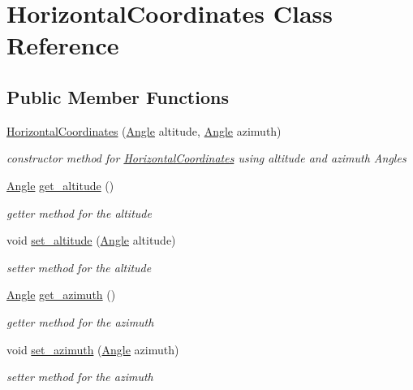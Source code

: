 \hypertarget{classHorizontalCoordinates}{}\section{Horizontal\+Coordinates Class Reference}
\label{classHorizontalCoordinates}
\subsection*{Public Member Functions}
\begin{DoxyCompactItemize}
\item 
\mbox{\hyperlink{classHorizontalCoordinates_ac5b7b0e7f60d7fdb97b7a36c3adedfe3}{Horizontal\+Coordinates}} (\mbox{\hyperlink{classAngle}{Angle}} altitude, \mbox{\hyperlink{classAngle}{Angle}} azimuth)
\begin{DoxyCompactList}\small\item\em constructor method for \mbox{\hyperlink{classHorizontalCoordinates}{Horizontal\+Coordinates}} using altitude and azimuth Angles \end{DoxyCompactList}\item 
\mbox{\hyperlink{classAngle}{Angle}} \mbox{\hyperlink{classHorizontalCoordinates_a9c28aef9ec9276dea5d58fe5d8c4bece}{get\+\_\+altitude}} ()
\begin{DoxyCompactList}\small\item\em getter method for the altitude \end{DoxyCompactList}\item 
void \mbox{\hyperlink{classHorizontalCoordinates_a2112ee5b54653ca30712b7fa4a17482d}{set\+\_\+altitude}} (\mbox{\hyperlink{classAngle}{Angle}} altitude)
\begin{DoxyCompactList}\small\item\em setter method for the altitude \end{DoxyCompactList}\item 
\mbox{\hyperlink{classAngle}{Angle}} \mbox{\hyperlink{classHorizontalCoordinates_afb4b783738b13dbfb23035946c8a210d}{get\+\_\+azimuth}} ()
\begin{DoxyCompactList}\small\item\em getter method for the azimuth \end{DoxyCompactList}\item 
void \mbox{\hyperlink{classHorizontalCoordinates_a05fb79f9470d72b9e895c2cb7e10da94}{set\+\_\+azimuth}} (\mbox{\hyperlink{classAngle}{Angle}} azimuth)
\begin{DoxyCompactList}\small\item\em setter method for the azimuth \end{DoxyCompactList}\item 

\end{DoxyCompactItemize}
